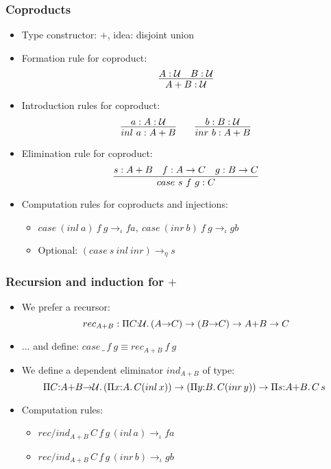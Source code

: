 \documentclass[handout]{beamer}
\newcommand{\depi}[3]{\Pi{#1{:}#2.\,#3}}
\newcommand{\UU}{{\cal U}}
\begin{document}
\frame
  {
  
    \frametitle{Coproducts}

    \begin{itemize}[<+->]
    \item Type constructor: $+$, idea: disjoint union
    \item Formation rule for coproduct:
\[\infer{{A}+{B}:\UU}{A:\UU \quad B :\UU}\]
    \item Introduction rules for coproduct:
\[\infer{inl~a:{A}+{B}}{a:A:\UU} \quad\quad \infer{inr~b:{A}+{B}}{b:B:\UU}\]
    \item Elimination rule for coproduct: 
\[\infer{case~s~f~g :C}{s:A+B\quad f:A\to C \quad g:B\to C}\]
    \item Computation rules for coproducts and injections:
       \begin{itemize}[<+->]
       \item $case~(inl~a)~f~g\to_\iota f a,~case~(inr~b)~f~g\to_\iota g b$
       \item Optional: $(case~s~inl~inr) \to_\eta s$
       \end{itemize}    
    \end{itemize}
  }
  
  

\frame
  {
  
    \frametitle{Recursion and induction for $+$}

    \begin{itemize}[<+->]
    \item We prefer a recursor:
$$rec_{A{+}B}:\depi{C}{\UU}{(A{\to}C)\to(B{\to}C)\to A{+}B \to C}$$
    \item ... and define: $case\,\_\,f~g \equiv rec_{A{+}B}~f~g$
    \item We define a dependent eliminator $ind_{A{+}B}$ of type:
$$\!\!\depi{C}{A{+}B{\to}\UU}
  {(\depi{x}{A}{C(inl\,x)})\to(\depi{y}{B}{C(inr\,y)})\to\depi{s}{A{+}B}{C\,s}}$$
    \item Computation rules: 
      \begin{itemize}[<+->]
      \item $rec/ind_{A{+}B}\,C\,f\,g\,(inl\,a) \to_\iota f a$ 
      \item $rec/ind_{A{+}B}\,C\,f\,g\,(inr\,b) \to_\iota g b$
      \end{itemize}  
    \end{itemize}
  }
\end{document}
